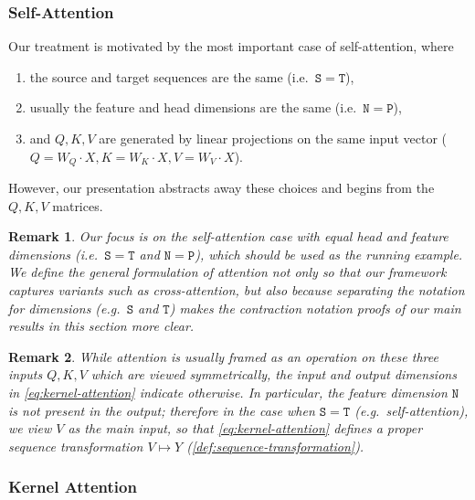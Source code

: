 \documentclass{article}
\newtheorem{remark}{Remark}
\begin{document}
\subsubsection{Self-Attention}
Our treatment is motivated by the most important case of self-attention, where
\begin{enumerate}[label=(\roman*)]
  \item the source and target sequences are the same (i.e.\ $\mathtt{S}=\mathtt{T}$),
  \item usually the feature and head dimensions are the same (i.e.\ $\mathtt{N}=\mathtt{P}$),
  \item and $Q, K, V$ are generated by linear projections on the same input vector ($Q = W_Q \cdot X, K = W_K \cdot X, V = W_V \cdot X$).
\end{enumerate}
However, our presentation abstracts away these choices and begins from the $Q, K, V$ matrices.

\begin{remark}
  Our focus is on the self-attention case with equal head and feature dimensions (i.e.\ $\mathtt{S}=\mathtt{T}$ and $\mathtt{N}=\mathtt{P}$),
  which should be used as the running example.
  We define the general formulation of attention not only so that our framework captures variants such as cross-attention,
  but also because separating the notation for dimensions (e.g.\ $\mathtt{S}$ and $\mathtt{T}$) makes the contraction notation proofs
  of our main results in this section more clear.
\end{remark}

\begin{remark}
  \label{rmk:attention-input}
  While attention is usually framed as an operation on these three inputs $Q, K, V$ which are viewed symmetrically,
  the input and output dimensions in \eqref{eq:kernel-attention} indicate otherwise.
  In particular, the feature dimension $\mathtt{N}$ is not present in the output;
  therefore in the case when $\mathtt{S}=\mathtt{T}$ (e.g.\ self-attention),
  we view $V$ as the main input, so that \eqref{eq:kernel-attention} defines a proper sequence transformation $V \mapsto Y$ (\cref{def:sequence-transformation}).
\end{remark}

\subsubsection{Kernel Attention}
\label{sec:attention:kernel}
\end{document}
